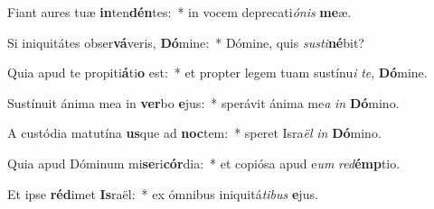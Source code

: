 \item Fiant aures tuæ \textbf{in}ten\textbf{dén}tes:~* in vocem deprecati\textit{ó}\textit{nis} \textbf{me}æ.
\item Si iniquitátes obser\textbf{vá}veris, \textbf{Dó}mine:~* Dómine, quis \textit{sus}\textit{ti}\textbf{né}bit?
\item Quia apud te propiti\textbf{á}ti\textbf{o} est:~* et propter legem tuam sustínu\textit{i} \textit{te}, \textbf{Dó}mine.
\item Sustínuit ánima mea in \textbf{ver}bo \textbf{e}jus:~* sperávit ánima me\textit{a} \textit{in} \textbf{Dó}mino.
\item A custódia matutína \textbf{us}que ad \textbf{noc}tem:~* speret Isra\textit{ël} \textit{in} \textbf{Dó}mino.
\item Quia apud Dóminum mi\textbf{se}ri\textbf{cór}dia:~* et copiósa apud e\textit{um} \textit{red}\textbf{émp}tio.
\item Et ipse \textbf{réd}imet \textbf{Is}raël:~* ex ómnibus iniquitá\textit{ti}\textit{bus} \textbf{e}jus.

